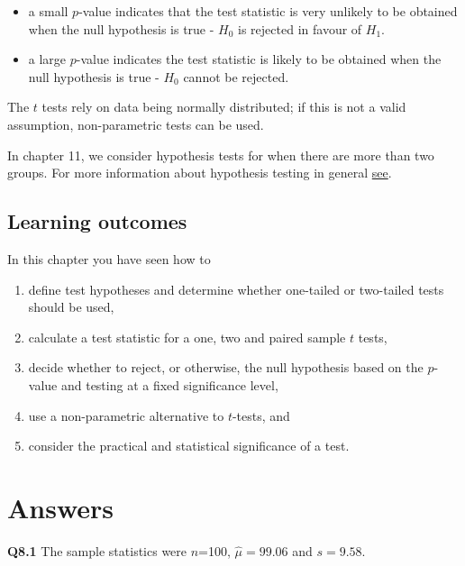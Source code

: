 \documentclass[
  oneside]{krantz}
\begin{document}
\begin{itemize}
\item
  a small \(p\)-value indicates that the test statistic is very unlikely to be obtained when the null hypothesis is true - \(H_0\) is rejected in favour of \(H_1\).
\item
  a large \(p\)-value indicates the test statistic is likely to be obtained when the null hypothesis is true - \(H_0\) cannot be rejected.
\end{itemize}

The \(t\) tests rely on data being normally distributed; if this is not a valid assumption, non-parametric tests can be used.

In chapter 11, we consider hypothesis tests for when there are more than two groups. For more information about hypothesis testing in general \href{https://www.khanacademy.org/math/probability/statistics-inferential/hypothesis-testing/v/hypothesis-testing-and-p-values}{see}.

\hypertarget{learning-outcomes-4}{%
\subsection{Learning outcomes}\label{learning-outcomes-4}}

In this chapter you have seen how to

\begin{enumerate}
\def\labelenumi{\arabic{enumi}.}
\item
  define test hypotheses and determine whether one-tailed or two-tailed tests should be used,
\item
  calculate a test statistic for a one, two and paired sample \(t\) tests,
\item
  decide whether to reject, or otherwise, the null hypothesis based on the \(p\)-value and testing at a fixed significance level,
\item
  use a non-parametric alternative to \(t\)-tests, and
\item
  consider the practical and statistical significance of a test.
\end{enumerate}

\hypertarget{ANShyp}{%
\section{Answers}\label{ANShyp}}

\textbf{Q8.1} The sample statistics were \(n\)=100, \(\hat \mu = 99.06\) and \(s=9.58\).
\end{document}
